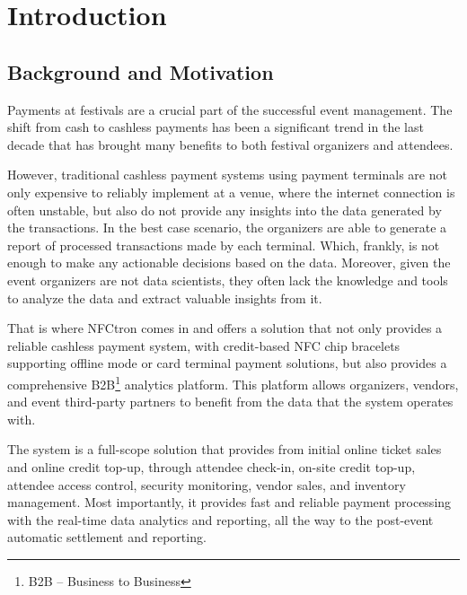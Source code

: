 \chapter*{Introduction}
\label{ch:introduction}


\section*{Background and Motivation}
\label{sec:introduction-background-motivation}
Payments at festivals are a crucial part of the successful event management.
The shift from cash to cashless payments has been a significant trend in the last decade that has brought many benefits to both festival organizers and attendees\cite{bl_en_waarom_festivals_overstappen_op_cashless_betalen}.

However, traditional cashless payment systems using payment terminals are not only expensive to reliably implement at a venue, where the internet connection is often unstable, but also do not provide any insights into the data generated by the transactions.
In the best case scenario, the organizers are able to generate a report of processed transactions made by each terminal.
Which, frankly, is not enough to make any actionable decisions based on the data.
Moreover, given the event organizers are not data scientists, they often lack the knowledge and tools to analyze the data and extract valuable insights from it.

That is where NFCtron comes in and offers a solution that not only provides a reliable cashless payment system, with credit-based NFC chip bracelets supporting offline mode or card terminal payment solutions, but also provides a comprehensive B2B\footnote{B2B – Business to Business} analytics platform.
This platform allows organizers, vendors, and event third-party partners to benefit from the data that the system operates with\cite{nfctron_en_company}.

The system is a full-scope solution that provides from initial online ticket sales and online credit top-up, through attendee check-in, on-site credit top-up, attendee access control, security monitoring, vendor sales, and inventory management.
Most importantly, it provides fast and reliable payment processing with the real-time data analytics and reporting, all the way to the post-event automatic settlement and reporting.

